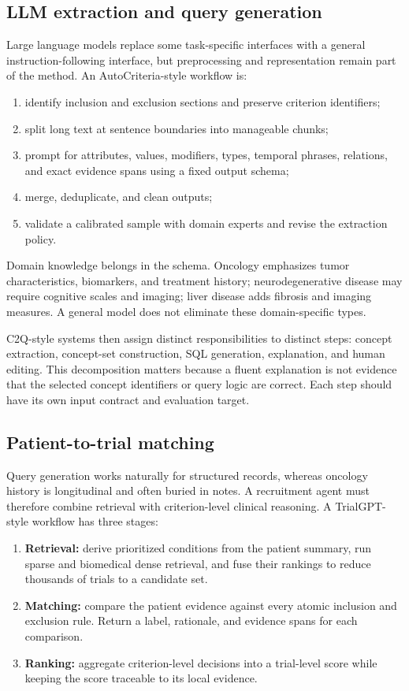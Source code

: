 \documentclass[12pt,oneside]{book}
\numberwithin{equation}{section}
\theoremstyle{definition}
\theoremstyle{plain}
\theoremstyle{remark}
\begin{document}
\subsection{LLM extraction and query generation}

Large language models replace some task-specific interfaces with a general
instruction-following interface, but preprocessing and representation remain
part of the method.  An AutoCriteria-style workflow is:
\begin{enumerate}
    \item identify inclusion and exclusion sections and preserve criterion
    identifiers;
    \item split long text at sentence boundaries into manageable chunks;
    \item prompt for attributes, values, modifiers, types, temporal phrases,
    relations, and exact evidence spans using a fixed output schema;
    \item merge, deduplicate, and clean outputs;
    \item validate a calibrated sample with domain experts and revise the
    extraction policy.
\end{enumerate}
Domain knowledge belongs in the schema.  Oncology emphasizes tumor
characteristics, biomarkers, and treatment history; neurodegenerative disease
may require cognitive scales and imaging; liver disease adds fibrosis and
imaging measures.  A general model does not eliminate these domain-specific
types.

C2Q-style systems then assign distinct responsibilities to distinct steps:
concept extraction, concept-set construction, SQL generation, explanation, and
human editing.  This decomposition matters because a fluent explanation is not
evidence that the selected concept identifiers or query logic are correct.
Each step should have its own input contract and evaluation target.

\subsection{Patient-to-trial matching}

Query generation works naturally for structured records, whereas oncology
history is longitudinal and often buried in notes.  A recruitment agent must
therefore combine retrieval with criterion-level clinical reasoning.  A
TrialGPT-style workflow has three stages:
\begin{enumerate}
    \item \textbf{Retrieval:} derive prioritized conditions from the patient
    summary, run sparse and biomedical dense retrieval, and fuse their
    rankings to reduce thousands of trials to a candidate set.
    \item \textbf{Matching:} compare the patient evidence against every atomic
    inclusion and exclusion rule.  Return a label, rationale, and evidence
    spans for each comparison.
    \item \textbf{Ranking:} aggregate criterion-level decisions into a
    trial-level score while keeping the score traceable to its local evidence.
\end{enumerate}
\end{document}
